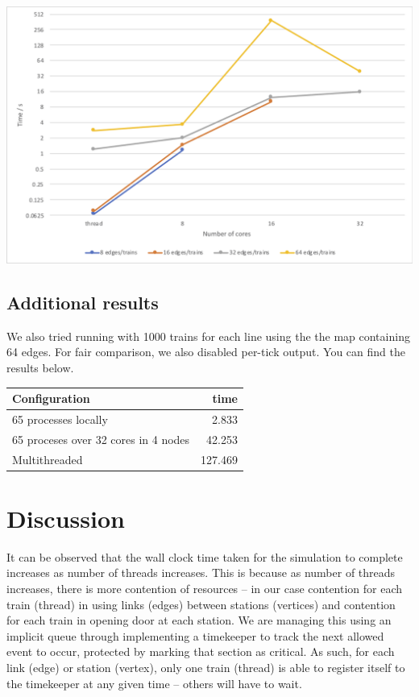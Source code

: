 \documentclass[a4paper,12pt]{article}
\begin{document}
\begin{center}
	\includegraphics[width=0.8\linewidth]{comparison-chart}
\end{center}

\subsection{Additional results}
We also tried running with 1000 trains for each line using the the map containing 64 edges. For fair comparison, we also disabled per-tick output. You can find the results below.

\begin{center}
	\begin{tabular}{l | r}
		Configuration                        & time    \\ \hline
		65 processes locally                 & 2.833   \\
		65 proceses over 32 cores in 4 nodes & 42.253  \\
		Multithreaded                        & 127.469 \\
	\end{tabular}
\end{center}

\section{Discussion}
It can be observed that the wall clock time taken for the simulation to complete increases as number of threads increases. This is because as number of threads increases, there is more contention of resources -- in our case contention for each train (thread) in using links (edges) between stations (vertices) and contention for each train in opening door at each station. We are managing this using an implicit queue through implementing a timekeeper to track the next allowed event to occur, protected by marking that section as critical. As such, for each link (edge) or station (vertex), only one train (thread) is able to register itself to the timekeeper at any given time -- others will have to wait.
\end{document}
